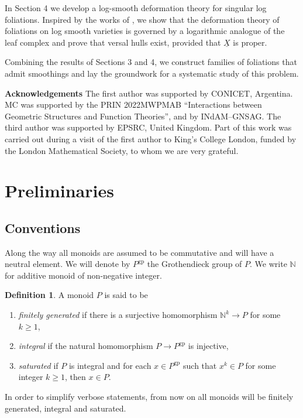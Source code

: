 \documentclass[reqno]{amsart}
\newcommand\N{\mathbb{N}}
\newcommand{\gp}{\mathrm{gp}}
\theoremstyle{definition}
\newtheorem{definition}[theorem]{Definition}
\theoremstyle{named}
\begin{document}
In Section 4 we develop  a log-smooth deformation theory for singular log foliations. Inspired by the works of \cite{kato1996dlog_def,gomez1988transverse}, we show that the deformation theory of foliations on log smooth varieties is governed by a logarithmic analogue of the leaf complex and prove that versal hulls exist, provided that $\underline{X}$ is proper.

Combining the results of Sections 3 and 4, we construct families of foliations that admit smoothings and lay the groundwork for a systematic study of this problem.
\medskip

\textbf{Acknowledgements} The first author was supported by CONICET, Argentina. 
MC was supported by the PRIN 2022MWPMAB ``Interactions between Geometric Structures and Function Theories'', and by INdAM–GNSAG. The third author was supported by EPSRC, United Kingdom. Part of this work was carried out during a visit of the first author to King's College London, funded by the London Mathematical Society, to whom we are very grateful.

\section{Preliminaries}
\subsection*{Conventions}

Along the way all monoids are assumed to be commutative and will have a neutral element. We will denote by $P^\gp$ the Grothendieck group of $P$. We write $\N$ for additive monoid of non-negative integer. 

\begin{definition}
A monoid $P$ is said to be
\begin{enumerate}
    \item \textit{finitely generated} if there is a surjective homomorphism $\N^k\rightarrow P$ for some $k\geqslant 1$,
    \item \textit{integral} if the natural homomorphism $P\rightarrow P^\gp$ is injective,
    \item \textit{saturated} if $P$ is integral and for each $x\in P^\gp$ such that $x^k\in P$ for some integer $k\geqslant 1$, then $x\in P$.
\end{enumerate}
\end{definition}

In order to simplify verbose statements, from now on all monoids will be finitely generated, integral and saturated. 
\end{document}
